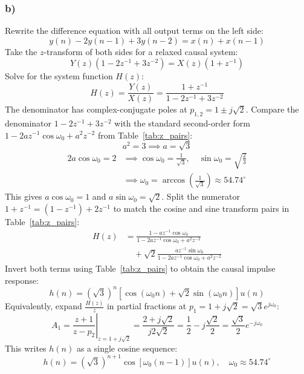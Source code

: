 \documentclass[12pt,a4paper]{article}
\begin{document}
\subsubsection*{b)}
Rewrite the difference equation with all output terms on the left side:
\[
y(n) - 2y(n-1) + 3y(n-2) = x(n) + x(n-1)
\]
Take the $z$-transform of both sides for a relaxed causal system:
\[
Y(z)(1 - 2z^{-1} + 3z^{-2}) = X(z)(1 + z^{-1})
\]
Solve for the system function $H(z)$:
\[
H(z) = \frac{Y(z)}{X(z)} = \frac{1 + z^{-1}}{1 - 2z^{-1} + 3z^{-2}}
\]
The denominator has complex-conjugate poles at $p_{1,2} = 1 \pm j\sqrt{2}$. Compare the denominator $1 - 2z^{-1} + 3z^{-2}$ with the standard second-order form $1 - 2az^{-1}\cos\omega_0 + a^2 z^{-2}$ from Table~\ref{tab:z_pairs}:
\[
a^2 = 3 \implies a = \sqrt{3}
\]
\[
\begin{aligned}
2a\cos\omega_0 = 2 &\implies \cos\omega_0 = \frac{1}{\sqrt{3}}, \quad \sin\omega_0 = \sqrt{\frac{2}{3}} \\
&\implies \omega_0 = \arccos\left(\frac{1}{\sqrt{3}}\right) \approx 54.74^\circ
\end{aligned}
\]
This gives $a\cos\omega_0 = 1$ and $a\sin\omega_0 = \sqrt{2}$. Split the numerator $1 + z^{-1} = (1 - z^{-1}) + 2z^{-1}$ to match the cosine and sine transform pairs in Table~\ref{tab:z_pairs}:
\[
\begin{aligned}
H(z) &= \frac{1 - az^{-1}\cos\omega_0}{1 - 2az^{-1}\cos\omega_0 + a^2 z^{-2}} \\
&\quad + \sqrt{2}\frac{az^{-1}\sin\omega_0}{1 - 2az^{-1}\cos\omega_0 + a^2 z^{-2}}
\end{aligned}
\]
Invert both terms using Table~\ref{tab:z_pairs} to obtain the causal impulse response:
\[
h(n) = (\sqrt{3})^n \left[\cos(\omega_0 n) + \sqrt{2}\sin(\omega_0 n)\right]u(n)
\]
Equivalently, expand $\frac{H(z)}{z}$ in partial fractions at $p_1 = 1 + j\sqrt{2} = \sqrt{3}e^{j\omega_0}$:
\[
A_1 = \left. \frac{z + 1}{z - p_2} \right|_{z = 1 + j\sqrt{2}} = \frac{2 + j\sqrt{2}}{j2\sqrt{2}} = \frac{1}{2} - j\frac{\sqrt{2}}{2} = \frac{\sqrt{3}}{2}e^{-j\omega_0}
\]
This writes $h(n)$ as a single cosine sequence:
\[
h(n) = (\sqrt{3})^{n+1}\cos\left[\omega_0(n - 1)\right]u(n), \quad \omega_0 \approx 54.74^\circ
\]
\end{document}

